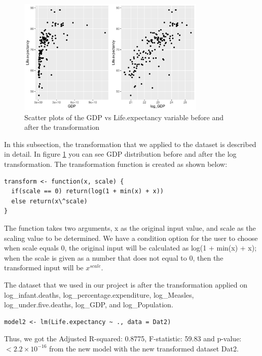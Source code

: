 \begin{figure}
  \centering
  \includegraphics[width = 0.8\textwidth]{figures/transforms}
  \caption{Scatter plots of the GDP vs Life.expectancy variable before and after the transformation}
  \label{fig:transforms}
\end{figure}

In this subsection, the transformation that we applied to the dataset is described in detail. In figure \ref{fig:transforms} you can see GDP distribution before and after the log transformation. The transformation function is created as shown below:

\begin{verbatim}
transform <- function(x, scale) {
  if(scale == 0) return(log(1 + min(x) + x))
  else return(x\^scale)
}
\end{verbatim}

The function takes two arguments, x as the original input value, and scale as the scaling value to be determined. We have a condition option for the user to choose when scale equals 0, the original input will be calculated as log(1 + min(x) + x); when the scale is given as a number that does not equal to 0, then the transformed input will be $x^{scale}$.



The dataset that we used in our project is after the transformation applied on log\_infant.deaths, log\_percentage.expenditure, log\_Measles, log\_under.five.deaths, log\_GDP, and log\_Population.

\begin{verbatim}
model2 <- lm(Life.expectancy ~ ., data = Dat2)
\end{verbatim}

Thus, we got the Adjusted R-squared: 0.8775, F-statistic: 59.83 and p-value: $< 2.2\times 10^{-16}$ from the new model with the new transformed dataset Dat2.

